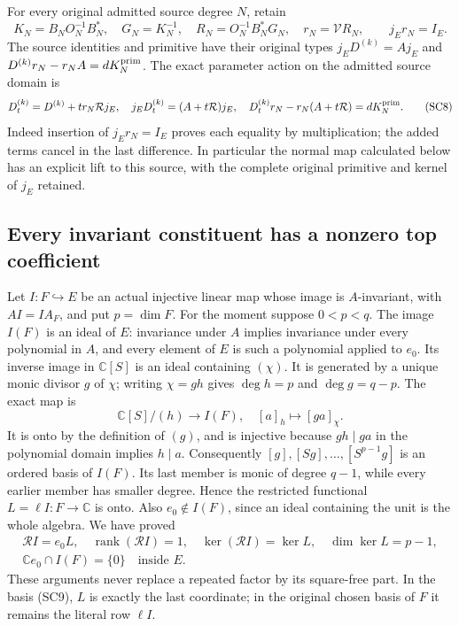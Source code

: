 For every original admitted source degree $N$, retain
\[
 K_N=B_NO_N^{-1}B_N^*,\quad G_N=K_N^{-1},\quad
 R_N=O_N^{-1}B_N^*G_N,\quad r_N=\mathcal V R_N,
 \qquad j_Er_N=I_E.
 \tag{SC7}
\]
The source identities and primitive have their original types
$j_ED^{(k)}=Aj_E$ and
$D^{(k)}r_N-r_NA=dK_N^{\rm prim}$.
The exact parameter action on the admitted source domain is
\[
 D_t^{(k)}=D^{(k)}+t r_N\mathcal Rj_E,
 \quad j_ED_t^{(k)}=(A+t\mathcal R)j_E,
 \quad D_t^{(k)}r_N-r_N(A+t\mathcal R)=dK_N^{\rm prim}.
 \tag{SC8}
\]
Indeed insertion of $j_Er_N=I_E$ proves each equality by multiplication;
the added terms cancel in the last difference.  In particular the
normal map calculated below has an explicit lift to this source, with
the complete original primitive and kernel of $j_E$ retained.

\subsection{Every invariant constituent has a nonzero top coefficient}

Let $I:F\hookrightarrow E$ be an actual injective linear map whose
image is $A$-invariant, with $AI=IA_F$, and put $p=\dim F$.
For the moment suppose $0<p<q$.  The image $I(F)$ is an ideal of
$E$: invariance under $A$ implies invariance under every polynomial
in $A$, and every element of $E$ is such a polynomial applied to $e_0$.
Its inverse image in $\mathbb C[S]$ is an ideal containing $(\chi)$.
It is generated by a unique monic divisor $g$ of $\chi$; writing
$\chi=gh$ gives $\deg h=p$ and $\deg g=q-p$.  The exact map is
\[
 \mathbb C[S]/(h)\longrightarrow I(F),\quad [a]_h\longmapsto[ga]_\chi.
 \tag{SC9}
\]
It is onto by the definition of $(g)$, and is injective because
$gh\mid ga$ in the polynomial domain implies $h\mid a$.
Consequently $[g],[Sg],\ldots,[S^{p-1}g]$ is an ordered basis of
$I(F)$.  Its last member is monic of degree $q-1$, while every earlier
member has smaller degree.  Hence the restricted functional
$L=\ell I:F\to\mathbb C$ is onto.  Also $e_0\notin I(F)$, since an
ideal containing the unit is the whole algebra.  We have proved
\[
 \begin{gathered}
 \mathcal R I=e_0L,\quad \operatorname{rank}(\mathcal R I)=1,
 \quad\ker(\mathcal R I)=\ker L,\quad\dim\ker L=p-1,\\
 \mathbb C e_0\cap I(F)=\{0\}\quad\text{inside }E.
 \end{gathered}
 \tag{SC10}
\]
These arguments never replace a repeated factor by its square-free
part.  In the basis (SC9), $L$ is exactly the last coordinate; in the
original chosen basis of $F$ it remains the literal row $\ell I$.

